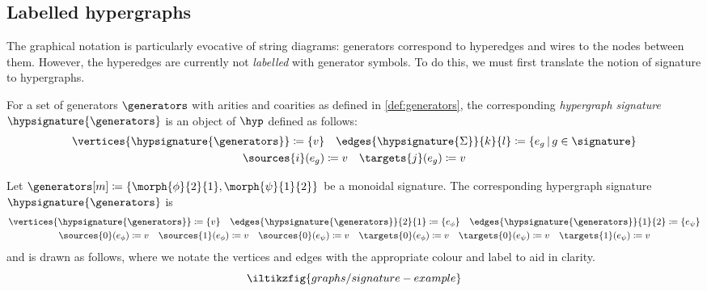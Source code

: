 \subsection{Labelled hypergraphs}

The graphical notation is particularly evocative of string diagrams: generators
correspond to hyperedges and wires to the nodes between them.
However, the hyperedges are currently not \emph{labelled} with generator
symbols.
To do this, we must first translate the notion of signature to hypergraphs.

\begin{definition}
    For a set of generators \(\generators\) with arities and coarities as defined
    in \cref{def:generators}, the corresponding \emph{hypergraph signature}
    \(\hypsignature{\generators}\) is an object of \(\hyp\) defined as follows:
    \begin{gather*}
        \vertices{\hypsignature{\generators}}
        \coloneqq
        \{ v \}
        \quad
        \edges{\hypsignature{\Sigma}}{k}{l}
        \coloneqq
        \{ e_g \,|\, g \in \signature\}
        \\
        \sources{i}(e_g) \coloneqq v
        \quad
        \targets{j}(e_g) \coloneqq v
    \end{gather*}
\end{definition}

\begin{example}\label{ex:labelled-hypergraph-signature}
    Let \(\generators[m] \coloneqq \{\morph{\phi}{2}{1}, \morph{\psi}{1}{2}\}\)
    be a monoidal signature.
    The corresponding hypergraph signature \(\hypsignature{\generators}\) is
    \begin{gather*}
        \vertices{\hypsignature{\generators}} \coloneqq \{v\}
        \quad
        \edges{\hypsignature{\generators}}{2}{1} \coloneqq \{e_\phi\}
        \quad
        \edges{\hypsignature{\generators}}{1}{2} \coloneqq \{e_\psi\}
        \\
        \sources{0}(e_\phi) \coloneqq v
        \quad
        \sources{1}(e_\phi) \coloneqq v
        \quad
        \sources{0}(e_\psi) \coloneqq v
        \quad
        \targets{0}(e_\phi) \coloneqq v
        \quad
        \targets{0}(e_\psi) \coloneqq v
        \quad
        \targets{1}(e_\psi) \coloneqq v
    \end{gather*}
    and is drawn as follows, where we notate the vertices and edges with the
    appropriate colour and label to aid in clarity.
    \[
        \iltikzfig{graphs/signature-example}
    \]
\end{example}

